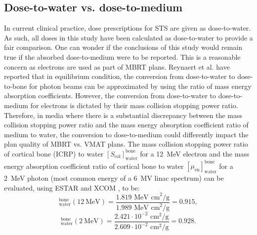 \documentclass[aapm,graphicx,superscriptaddress]{revtex4-1}
\begin{document}
\subsection{Dose-to-water vs. dose-to-medium}
In current clinical practice, dose prescriptions for STS are given as dose-to-water. %
As such, all doses in this study have been calculated as dose-to-water to provide a fair comparison. One can wonder if the conclusions of this study would remain true if the absorbed dose-to-medium were to be reported. This is a reasonable concern as electrons are used as part of MBRT plans. Reynaert et al. \cite{REYNAERT201826} have reported that in equilibrium condition, the conversion from dose-to-water to dose-to-bone for photon beams can be approximated by using the ratio of mass energy absorption coefficients. However, the conversion from dose-to-water to dose-to-medium for electrons is dictated by their mass collision stopping power ratio. Therefore, in media where there is a substantial discrepancy between the mass collision stopping power ratio and the mass energy absorption coefficient ratio of medium to water, the conversion to dose-to-medium could differently impact the plan quality of MBRT vs. VMAT plans. The mass collision stopping power ratio of cortical bone (ICRP) to water $[S_\text{col}]^\text{bone}_\text{water}$ for a 12~MeV electron and the mass energy absorption coefficient ratio of cortical bone to water $[\mu_\text{en}]^\text{bone}_\text{water}$ for a 2~MeV photon (most common energy of a 6~MV linac spectrum) can be evaluated, using ESTAR \cite{estar} and XCOM \cite{xcom}, to be:
\begin{equation}
    [S_\text{col}]^\text{bone}_\text{water}(12~\text{MeV}) = \frac{1.819 \text{ MeV cm}^2/\text{g}}{1.989 \text{ MeV cm}^2/\text{g}} = 0.915,
\end{equation}
\begin{equation}
    [\mu_\text{en}]^\text{bone}_\text{water}(2~\text{MeV}) = \frac{2.421 \cdot 10^{-2}\text{ cm}^2\text{/g}}{2.609 \cdot 10^{-2}\text{ cm}^2\text{/g}} = 0.928.
\end{equation}
\end{document}
